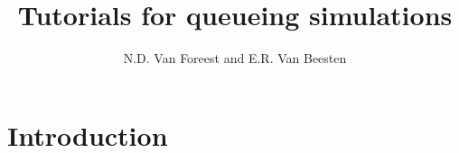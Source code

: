 \usepackage[solutionfiles]{optional}



\usepackage[english]{babel}

\usepackage{mathtools,amsthm,amssymb}
\usepackage{verbatim}
\usepackage[colorlinks=true]{hyperref}

\usepackage[T1]{fontenc}
\usepackage{fouriernc}
\usepackage{fontawesome} %
\newcommand{\hintsymbol}{\marginpar{\center{\faLinux}}}


\usepackage{pythontex}

\usepackage{fancyhdr}
\pagestyle{fancy}
\fancyhead{} %
\fancyhead[LO, LE]{\rightmark}
\fancyfoot{} %
\fancyfoot[C]{\thepage}
\setlength{\headheight}{14pt} 

\renewcommand{\Hintlabel}[1]{\textbf{h.#1}}
\renewcommand{\Solutionlabel}[1]{\textbf{s.#1}}

\theoremstyle{definition} %
\newtheorem{exercise}{Exercise}[section]

\usepackage{etoolbox}%
\AtBeginEnvironment{hint}{\hintsymbol} 

\newcommand{\E}[1]{\,\mathsf{E}\left[#1\right]}

\title{Tutorials for queueing simulations}
\author{N.D. Van Foreest and E.R. Van Beesten}


\maketitle

\setcounter{tocdepth}{1}
\tableofcontents

\clearpage



\section*{Introduction}


